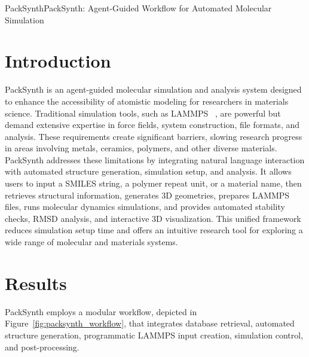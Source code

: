 
\begin{teamsubmission}{PackSynth}{PackSynth: Agent-Guided Workflow for Automated Molecular Simulation}

\section*{Introduction}
PackSynth is an agent-guided molecular simulation and analysis system designed to enhance the accessibility of atomistic modeling for researchers in materials science. Traditional simulation tools, such as LAMMPS ~\cite{thompson2022lammps}, are powerful but demand extensive expertise in force fields, system construction, file formats, and analysis. These requirements create significant barriers, slowing research progress in areas involving metals, ceramics, polymers, and other diverse materials. PackSynth addresses these limitations by integrating natural language interaction with automated structure generation, simulation setup, and analysis. It allows users to input a SMILES string, a polymer repeat unit, or a material name, then retrieves structural information, generates 3D geometries, prepares LAMMPS files, runs molecular dynamics simulations, and provides automated stability checks, RMSD analysis, and interactive 3D visualization. This unified framework reduces simulation setup time and offers an intuitive research tool for exploring a wide range of molecular and materials systems.


\section*{Results}
PackSynth employs a modular workflow, depicted in Figure~\ref{fig:packsynth_workflow}, that integrates database retrieval, automated structure generation, programmatic LAMMPS input creation, simulation control, and post-processing.


\end{teamsubmission}
